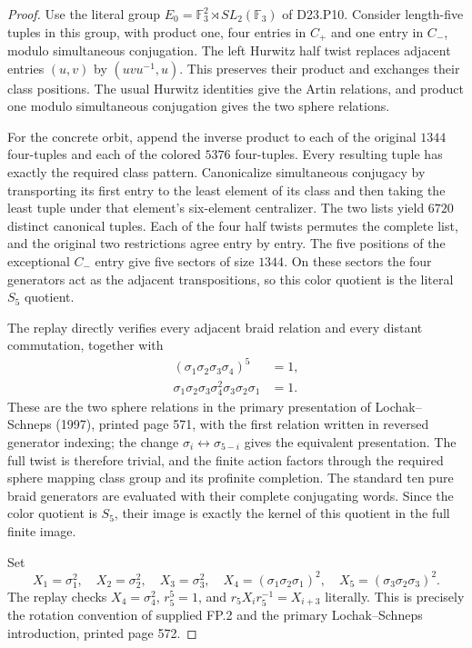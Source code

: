 \begin{proof}
Use the literal group $E_0=\mathbb F_3^2\rtimes
SL_2(\mathbb F_3)$ of D23.P10. Consider length-five
tuples in this group, with product one, four entries
in $C_+$ and one entry in $C_-$, modulo simultaneous
conjugation. The left Hurwitz half twist replaces
adjacent entries $(u,v)$ by $(uvu^{-1},u)$. This
preserves their product and exchanges their class
positions. The usual Hurwitz identities give the Artin
relations, and product one modulo simultaneous
conjugation gives the two sphere relations.

For the concrete orbit, append the inverse product to
each of the original $1344$ four-tuples and each of
the colored $5376$ four-tuples. Every resulting tuple
has exactly the required class pattern. Canonicalize
simultaneous conjugacy by transporting its first entry
to the least element of its class and then taking the
least tuple under that element's six-element centralizer.
The two lists yield $6720$ distinct canonical tuples.
Each of the four half twists permutes the complete list,
and the original two restrictions agree entry by entry.
The five positions of the exceptional $C_-$ entry give
five sectors of size $1344$. On these sectors the four
generators act as the adjacent transpositions, so this
color quotient is the literal $S_5$ quotient.

The replay directly verifies every adjacent braid
relation and every distant commutation, together with
\[
\begin{split}
 (\sigma_1\sigma_2\sigma_3\sigma_4)^5&=1,\\
 \sigma_1\sigma_2\sigma_3\sigma_4^2
                   \sigma_3\sigma_2\sigma_1&=1.
\end{split}
\]
These are the two sphere relations in the primary
presentation of Lochak--Schneps (1997), printed page
571, with the first relation written in reversed
generator indexing; the change $\sigma_i\leftrightarrow
\sigma_{5-i}$ gives the equivalent presentation.
The full twist is therefore trivial, and the
finite action factors through the required sphere
mapping class group and its profinite completion.
The standard ten pure braid generators are evaluated
with their complete conjugating words. Since the color
quotient is $S_5$, their image is exactly the kernel of
this quotient in the full finite image.

Set
\[
 X_1=\sigma_1^2,\quad X_2=\sigma_2^2,\quad
 X_3=\sigma_3^2,\quad X_4=(\sigma_1\sigma_2\sigma_1)^2,
 \quad X_5=(\sigma_3\sigma_2\sigma_3)^2.
\]
The replay checks $X_4=\sigma_4^2$, $r_5^5=1$, and
$r_5X_ir_5^{-1}=X_{i+3}$ literally. This is precisely
the rotation convention of supplied FP.2 and the primary
Lochak--Schneps introduction, printed page 572.


\end{proof}
